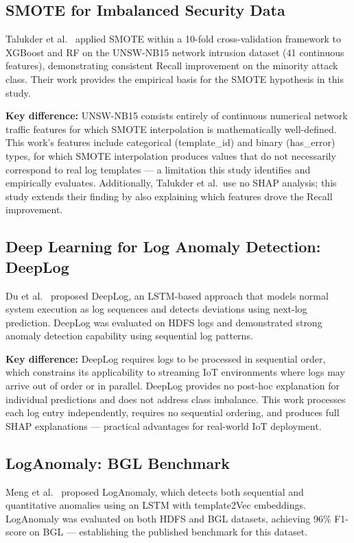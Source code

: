 \documentclass[conference]{IEEEtran}
\begin{document}
\subsection{SMOTE for Imbalanced Security Data}

Talukder et al.\ \cite{talukder2024} applied SMOTE within a 10-fold
cross-validation framework to XGBoost and RF on the UNSW-NB15 network
intrusion dataset (41 continuous features), demonstrating consistent Recall
improvement on the minority attack class. Their work provides the empirical
basis for the SMOTE hypothesis in this study.

\textbf{Key difference:} UNSW-NB15 consists entirely of continuous numerical
network traffic features for which SMOTE interpolation is mathematically
well-defined. This work's features include categorical (template\_id) and
binary (has\_error) types, for which SMOTE interpolation produces values
that do not necessarily correspond to real log templates --- a limitation
this study identifies and empirically evaluates. Additionally, Talukder
et al.\ use no SHAP analysis; this study extends their finding by also
explaining which features drove the Recall improvement.

\subsection{Deep Learning for Log Anomaly Detection: DeepLog}

Du et al.\ \cite{du2017deeplog} proposed DeepLog, an LSTM-based approach
that models normal system execution as log sequences and detects deviations
using next-log prediction. DeepLog was evaluated on HDFS logs and
demonstrated strong anomaly detection capability using sequential log
patterns.

\textbf{Key difference:} DeepLog requires logs to be processed in sequential
order, which constrains its applicability to streaming IoT environments
where logs may arrive out of order or in parallel. DeepLog provides no
post-hoc explanation for individual predictions and does not address class
imbalance. This work processes each log entry independently, requires no
sequential ordering, and produces full SHAP explanations --- practical
advantages for real-world IoT deployment.

\subsection{LogAnomaly: BGL Benchmark}

Meng et al.\ \cite{meng2019loganomaly} proposed LogAnomaly, which detects
both sequential and quantitative anomalies using an LSTM with template2Vec
embeddings. LogAnomaly was evaluated on both HDFS and BGL datasets,
achieving 96\% F1-score on BGL --- establishing the published benchmark for
this dataset.
\end{document}
